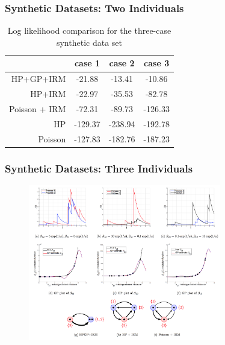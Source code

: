 \documentclass{beamer}
\begin{document}
\begin{frame}
\frametitle{Synthetic Datasets: Two Individuals}
\begin{table}[ht]
\caption{Log likelihood comparison for the three-case synthetic data set}
\begin{center}
\begin{small}
\begin{sc}
\begin{tabular}{|r|c|c|c|}
\hline
  & case 1  & case 2 & case 3\\
\hline
HP+GP+IRM & -21.88 & -13.41 & -10.86\\
\hline
HP+IRM & -22.97 & -35.53 & -82.78\\
\hline
Poisson + IRM & -72.31  & -89.73 & -126.33\\
\hline
HP & -129.37  & -238.94 & -192.78\\
\hline
Poisson & -127.83  & -182.76 & -187.23\\
\hline
\end{tabular}\label{synthetic training log  likelihood}
\end{sc}
\end{small}
\end{center}
\end{table}
\end{frame}


\begin{frame}
\frametitle{Synthetic Datasets: Three Individuals}
\begin{figure}
  \centering  
	\includegraphics[width=0.75\textwidth]{figures/example2}
  \label{fi: example 1}
\end{figure}
\end{frame}
\end{document}
